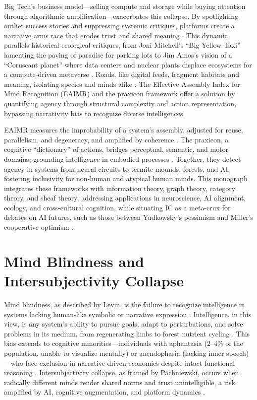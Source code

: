 \documentclass{article}
\begin{document}
Big Tech’s business model—selling compute and storage while buying attention through algorithmic amplification—exacerbates this collapse. By spotlighting outlier success stories and suppressing systemic critiques, platforms create a narrative arms race that erodes trust and shared meaning \citep{zuboff2019age, wu2016attention}. This dynamic parallels historical ecological critiques, from Joni Mitchell’s “Big Yellow Taxi” lamenting the paving of paradise for parking lots to Jim Amos’s vision of a “Coruscant planet” where data centers and nuclear plants displace ecosystems for a compute-driven metaverse \citep{carr2010shallows}. Roads, like digital feeds, fragment habitats and meaning, isolating species and minds alike \citep{lanham2006economics}. The Effective Assembly Index for Mind Recognition (EAIMR) and the praxicon framework offer a solution by quantifying agency through structural complexity and action representation, bypassing narrativity bias to recognize diverse intelligences.

EAIMR measures the improbability of a system’s assembly, adjusted for reuse, parallelism, and degeneracy, and amplified by coherence \citep{walker2013algorithmic}. The praxicon, a cognitive “dictionary” of actions, bridges perceptual, semantic, and motor domains, grounding intelligence in embodied processes \citep{pastra2011praxicon, peigneux2004imaging}. Together, they detect agency in systems from neural circuits to termite mounds, forests, and AI, fostering inclusivity for non-human and atypical human minds. This monograph integrates these frameworks with information theory, graph theory, category theory, and sheaf theory, addressing applications in neuroscience, AI alignment, ecology, and cross-cultural cognition, while situating IC as a meta-crux for debates on AI futures, such as those between Yudkowsky’s pessimism and Miller’s cooperative optimism \citep{yudkowsky2008artificial, miller2006robust}.

\section{Mind Blindness and Intersubjectivity Collapse}
\label{sec:mind_blindness}

Mind blindness, as described by Levin, is the failure to recognize intelligence in systems lacking human-like symbolic or narrative expression \citep{levin2022technological}. Intelligence, in this view, is any system’s ability to pursue goals, adapt to perturbations, and solve problems in its medium, from regenerating limbs to forest nutrient cycling \citep{levin2019computational}. This bias extends to cognitive minorities—individuals with aphantasia (2–4\% of the population, unable to visualize mentally) or anendophasia (lacking inner speech)—who face exclusion in narrative-driven economies despite intact functional reasoning \citep{jacobs2022, bps_anendophasia}. Intersubjectivity collapse, as framed by Pachniewski, occurs when radically different minds render shared norms and trust unintelligible, a risk amplified by AI, cognitive augmentation, and platform dynamics \citep{pachniewski2023intersubjectivity}.
\end{document}
